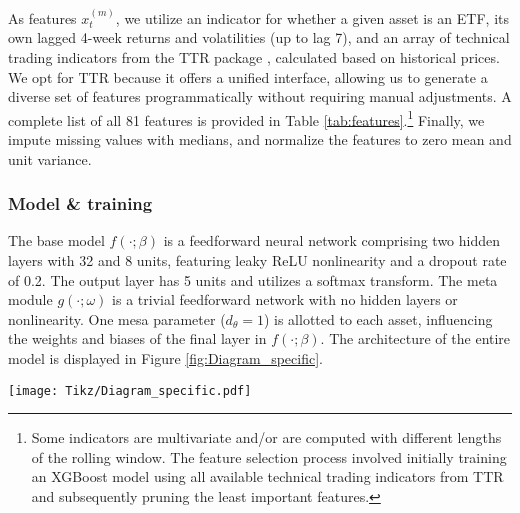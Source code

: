\documentclass[3p,times,twocolumn]{elsarticle}
\begin{document}
As features $x_{t}^{(m)}$, we utilize an indicator for whether a given asset is an ETF, its own lagged 4-week returns and volatilities (up to lag 7), and an array of technical trading indicators from the TTR package \citep{ulrichTTRTechnicalTrading2021}, calculated based on historical prices.
We opt for TTR because it offers a unified interface, allowing us to generate a diverse set of features programmatically without requiring manual adjustments. 
A complete list of all 81 features is provided in Table \ref{tab:features}.\footnote{
    Some indicators are multivariate and/or are computed with different lengths of the rolling window.
    The feature selection process involved initially training an XGBoost model \citep{chenXgboostExtremeGradient2023} using all available technical trading indicators from TTR and subsequently pruning the least important features.
}
Finally, we impute missing values with medians, and normalize the features to zero mean and unit variance.

\subsubsection{Model \& training}

The base model $f(\cdot;\beta)$ is a feedforward neural network comprising two hidden layers with 32 and 8 units, featuring leaky ReLU nonlinearity and a dropout rate of 0.2. 
The output layer has 5 units and utilizes a softmax transform.
The meta module $g(\cdot;\omega)$ is a trivial feedforward network with no hidden layers or nonlinearity.
One mesa parameter ($d_{\theta}=1$) is allotted to each asset, influencing the weights and biases of the final layer in $f(\cdot; \beta)$.
The architecture of the entire model is displayed in Figure \ref{fig:Diagram_specific}.

\begin{figure*}[!htbp]
    \centering
    \texttt{[image: Tikz/Diagram\_specific.pdf]}
    \caption{
        A diagram of the MtMs model applied to M6.
        In the case of M6, there are 1000 tasks/assets (100 specified by the organizers and 900 from the additional 9 auxiliary M6-like datasets). 
        Each asset is allotted one univariate mesa parameter $\theta$, which, through the meta module $g(\theta; \omega)$, determines the parameters $\beta$ of the network $f(x;\beta)$. 
        This network then processes the corresponding feature vector $x$ to generate the prediction $\hat{y}$.
        The meta module $g(\theta; \omega)$ is a trivial single-layer neural network that connects $\theta$ to the weights and biases of the last layer of the network $f$; $\beta_{connected}$.
        The remaining nodes corresponding to parameters $\beta_{orphaned}$ are not influenced by $\theta$ and are hence constant across all tasks/assets.
    }
    \label{fig:Diagram_specific}
\end{figure*}
\end{document}

